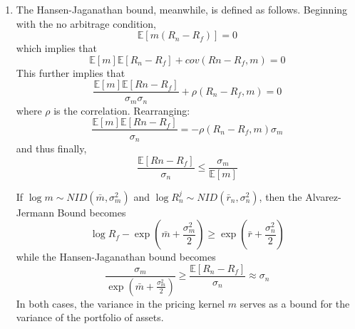 \documentclass[11pt]{article}
\newcommand{\ev}{\mathbb{E}}
\begin{document}
\begin{enumerate}
\begin{enumerate}
			\item The Hansen-Jaganathan bound, meanwhile, is defined as follows. Beginning with the no arbitrage condition,
			\[\ev[m(R_n - R_f)] = 0\]
			which implies that
			\[\ev[m]\ev[R_n - R_f] + cov(Rn - R_f, m) = 0\]
			This further implies that
			\[\frac{\ev[m]\ev[Rn - R_f]}{\sigma_m \sigma_n} + \rho(R_n - R_f, m) = 0\]
			where $ \rho $ is the correlation. Rearranging:
			\[\frac{\ev[m]\ev[Rn - R_f]}{\sigma_n} = -\rho(R_n - R_f, m)\sigma_m\]
			and thus finally,
			\[\frac{\ev[Rn - R_f]}{\sigma_n} \leq \frac{\sigma_m}{\ev[m]}\]
			
			If $ \log m \sim NID(\bar{m}, \sigma_m^2) $ and $ \log R_n^j \sim NID(\bar{r}_n, \sigma_n^2) $, then the Alvarez-Jermann Bound becomes
			\[\log R_f - \exp(\bar{m} + \frac{\sigma_m^2}{2}) \geq \exp(\bar{r} + \frac{\sigma_n^2}{2})\]
			while the Hansen-Jaganathan bound becomes
			\[\frac{\sigma_m}{\exp(\bar{m} + \frac{\sigma_m^2}{2})} \geq \frac{\ev[R_n - R_f]}{\sigma_n} \approx \sigma_n\]
			In both cases, the variance in the pricing kernel $ m $ serves as a bound for the variance of the portfolio of assets. 
		\end{enumerate} 
		
\end{enumerate}



\end{document}
